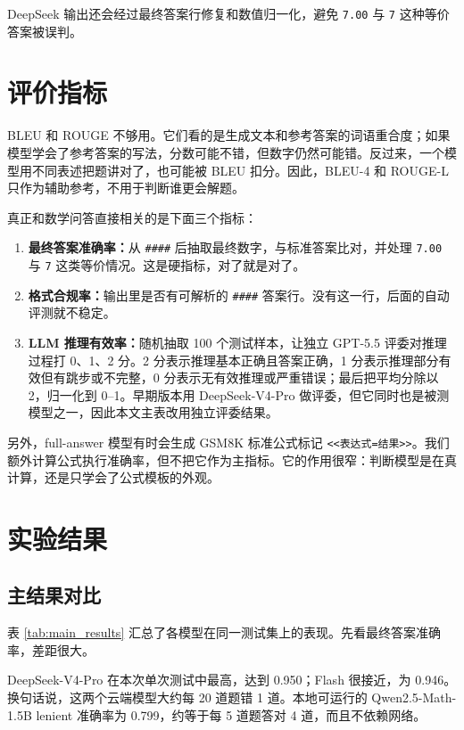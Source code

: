 \documentclass[UTF8,a4paper,zihao=-4]{ctexart}
\begin{document}
DeepSeek 输出还会经过最终答案行修复和数值归一化，避免 \texttt{7.00} 与 \texttt{7} 这种等价答案被误判。

\section{评价指标}

BLEU 和 ROUGE 不够用。它们看的是生成文本和参考答案的词语重合度；如果模型学会了参考答案的写法，分数可能不错，但数字仍然可能错。反过来，一个模型用不同表述把题讲对了，也可能被 BLEU 扣分。因此，BLEU-4 和 ROUGE-L 只作为辅助参考，不用于判断谁更会解题。

真正和数学问答直接相关的是下面三个指标：

\begin{enumerate}
  \item \textbf{最终答案准确率：}从 \texttt{\#\#\#\#} 后抽取最终数字，与标准答案比对，并处理 \texttt{7.00} 与 \texttt{7} 这类等价情况。这是硬指标，对了就是对了。
  \item \textbf{格式合规率：}输出里是否有可解析的 \texttt{\#\#\#\#} 答案行。没有这一行，后面的自动评测就不稳定。
  \item \textbf{LLM 推理有效率：}随机抽取 100 个测试样本，让独立 GPT-5.5 评委对推理过程打 0、1、2 分。2 分表示推理基本正确且答案正确，1 分表示推理部分有效但有跳步或不完整，0 分表示无有效推理或严重错误；最后把平均分除以 2，归一化到 0--1。早期版本用 DeepSeek-V4-Pro 做评委，但它同时也是被测模型之一，因此本文主表改用独立评委结果。
\end{enumerate}

另外，full-answer 模型有时会生成 GSM8K 标准公式标记 \texttt{<<表达式=结果>>}。我们额外计算公式执行准确率，但不把它作为主指标。它的作用很窄：判断模型是在真计算，还是只学会了公式模板的外观。

\section{实验结果}

\subsection{主结果对比}

表 \ref{tab:main_results} 汇总了各模型在同一测试集上的表现。先看最终答案准确率，差距很大。

DeepSeek-V4-Pro 在本次单次测试中最高，达到 0.950；Flash 很接近，为 0.946。换句话说，这两个云端模型大约每 20 道题错 1 道。本地可运行的 Qwen2.5-Math-1.5B lenient 准确率为 0.799，约等于每 5 道题答对 4 道，而且不依赖网络。
\end{document}
